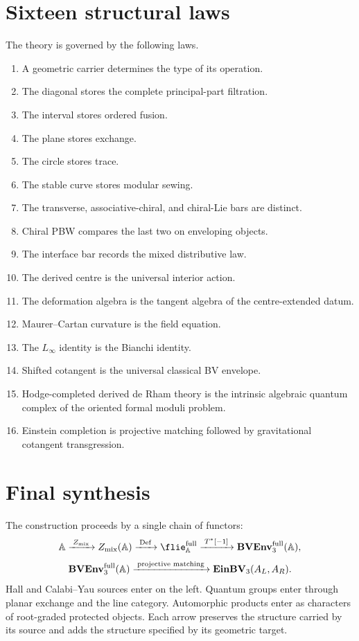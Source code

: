 \chapter{Sixteen structural laws}
The theory is governed by the following laws.
\begin{enumerate}
\item A geometric carrier determines the type of its operation.
\item The diagonal stores the complete principal-part filtration.
\item The interval stores ordered fusion.
\item The plane stores exchange.
\item The circle stores trace.
\item The stable curve stores modular sewing.
\item The transverse, associative-chiral, and chiral-Lie bars are distinct.
\item Chiral PBW compares the last two on enveloping objects.
\item The interface bar records the mixed distributive law.
\item The derived centre is the universal interior action.
\item The deformation algebra is the tangent algebra of the centre-extended datum.
\item Maurer--Cartan curvature is the field equation.
\item The $L_\infty$ identity is the Bianchi identity.
\item Shifted cotangent is the universal classical BV envelope.
\item Hodge-completed derived de Rham theory is the intrinsic algebraic quantum complex of the oriented formal moduli problem.
\item Einstein completion is projective matching followed by gravitational cotangent transgression.
\end{enumerate}

\chapter{Final synthesis}
The construction proceeds by a single chain of functors:
\[
\mathbb A
\xrightarrow{\;Z_{\mathrm{mix}}\;}
Z_{\mathrm{mix}}(\mathbb A)
\xrightarrow{\;\operatorname{Def}\;}
\flie_{\mathbb A}^{\mathrm{full}}
\xrightarrow{\;T^*[-1]\;}
\BVEnv_3^{\mathrm{full}}(\mathbb A),
\]
\[
\mathbf{BVEnv}_3^{\mathrm{full}}(\mathbb A)
\xrightarrow{\;\text{projective matching}\;}
\mathbf{EinBV}_3(A_L,A_R).
\]
Hall and Calabi--Yau sources enter on the left.  Quantum groups enter through planar exchange and the line category.  Automorphic products enter as characters of root-graded protected objects.  Each arrow preserves the structure carried by its source and adds the structure specified by its geometric target.

